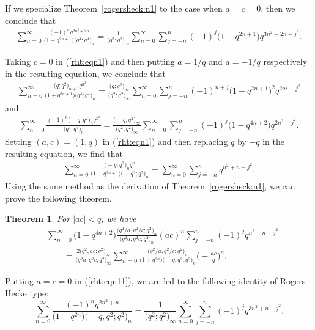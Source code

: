 \documentclass[10pt,a4paper]{amsart}
\numberwithin{equation}{section}
\newtheorem{Theorem}{Theorem}[section]
\begin{document}
If we specialize Theorem~\ref{rogersheck:n1} to the case when $a=c=0$, then we conclude that
\begin{align*}%
	\sum_{n=0}^\infty \frac{(-1)^n q^{2n^2+2n}}{\bigl(1+q^{2n+1}\bigr) \bigl(q^4; q^4\bigr)_n}
	=\frac{1}{\bigl(q^2; q^2\bigr)_\infty}\sum_{n=0}^\infty \sum_{j=-n}^n (-1)^j
	\bigl(1-q^{2n+1}\bigr) q^{3n^2+2n-j^2}.
\end{align*}


Taking $c=0$ in (\ref{rht:eqn1}) and then putting $a=1/q$ and $a=-1/q$ respectively in the resulting equation, we conclude that
\begin{align*}%
\sum_{n=0}^\infty \frac{\bigl(q; q^2\bigr)_{n+1} q^{n^2}}{\bigl(1+q^{2n+1}\bigr)\bigl(q^4; q^4\bigr)_n}
=\frac{\bigl(q; q^2\bigr)_\infty}{\bigl(q^2; q^2\bigr)_\infty}
\sum_{n=0}^\infty \sum_{j=-n}^n (-1)^{n+j} \bigl(1-q^{2n+1}\bigr)^2 q^{2n^2-j^2}
\end{align*}
and
\begin{align*}%
\sum_{n=0}^\infty \frac{(-1)^n\bigl(-q; q^2\bigr)_n q^{n^2}}{\bigl(q^4; q^4\bigr)_n}
=\frac{\bigl(-q; q^2\bigr)_\infty}{\bigl(q^2; q^2\bigr)_\infty}
\sum_{n=0}^\infty \sum_{j=-n}^n (-1)^{j} \bigl(1-q^{4n+2}\bigr) q^{2n^2-j^2}.
\end{align*}
Setting $(a, c)=(1, q)$ in (\ref{rht:eqn1}) and then replacing $q$ by $-q$ in the resulting equation, we find that~\cite[equation~(2.10)]{WangChern2019}
\begin{align*}%
\sum_{n=0}^\infty \frac{\bigl(-q; q^2\bigr)_n q^n }{\bigl(1-q^{2n+1}\bigr) \bigl(-q^2; q^2\bigr)_n}=\sum_{n=0}^\infty \sum_{j=-n}^n q^{n^2+n-j^2}.
\end{align*}
Using the same method as the derivation of Theorem~\ref{rogersheck:n1}, we can prove the following theorem.
\begin{Theorem}%
For $|ac|<q$, we have
\begin{align}
	&\sum_{n=0}^\infty \bigl(1-q^{4n+2}\bigr) \frac{\bigl(q^2/a, q^2/c; q^2\bigr)_n}{\bigl(q^2 a, q^2c; q^2\bigr)_n} (ac)^n \sum_{j=-n}^n (-1)^j q^{n^2-n-j^2}\nonumber\\
	&\qquad{}=\frac{2\bigl(q^2, ac; q^2\bigr)_\infty}{\bigl(q^2 a, q^2 c; q^2\bigr)_\infty}	\sum_{n=0}^\infty \frac{\bigl(q^2/a, q^2/c; q^2\bigr)_n}{\bigl(1+q^{2n}\bigr)\bigl(-q, q^2; q^2\bigr)_n }\biggl(-\frac{ac}{q}\biggr)^n.\label{rht:eqn11}	
\end{align}
\end{Theorem}
Putting $a=c=0$ in (\ref{rht:eqn11}), we are led to the following identity of Rogers--Hecke type:
\begin{equation*}%
\sum_{n=0}^\infty \frac{(-1)^n q^{2n^2+n}}{\bigl(1+q^{2n}\bigr)\bigl(-q, q^2; q^2\bigr)_n}
=\frac{1}{\bigl(q^2; q^2\bigr)_\infty}
\sum_{n=0}^\infty \sum_{j=-n}^n (-1)^j q^{3n^2+n-j^2}.
\end{equation*}
\end{document}
